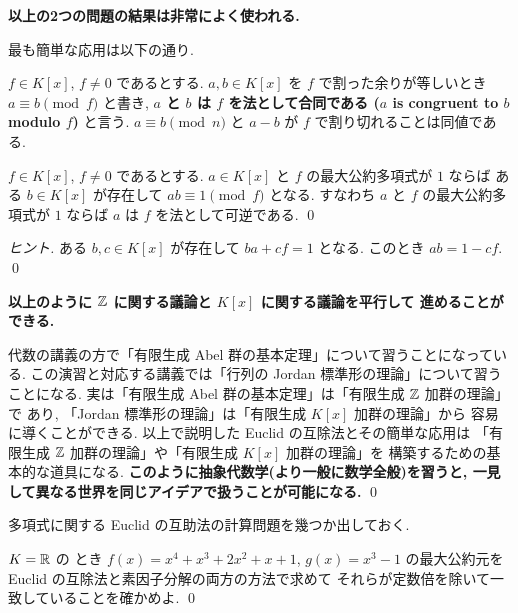 \documentclass[12pt,twoside]{jarticle}
\begin{document}

\bigskip
{\Large\bf 以上の2つの問題の結果は非常によく使われる.}
\bigskip


最も簡単な応用は以下の通り.

$f\in K[x]$, $f\ne 0$ であるとする.
$a,b\in K[x]$ を $f$ で割った余りが等しいとき $a\equiv b\pmod{f}$ と書き, 
{\bf $a$ と $b$ は $f$ を法として合同である 
($a$ is congruent to $b$ modulo $f$)} と言う.
$a\equiv b\pmod{n}$ と $a-b$ が $f$ で割り切れることは同値である.

\begin{question}[5点]
 $f\in K[x]$, $f\ne 0$ であるとする.
 $a\in K[x]$ と $f$ の最大公約多項式が $1$ ならば
 ある $b\in K[x]$ が存在して $ab\equiv 1\pmod{f}$ となる.
 すなわち $a$ と $f$ の最大公約多項式が $1$ ならば %
 $a$ は $f$ を法として可逆である.
 \qed
\end{question}

\begin{proof}[ヒント]
 ある $b,c\in K[x]$ が存在して $ba+cf=1$ となる.
 このとき $ab = 1 - cf$. \qed
\end{proof}


\bigskip
{\Large\bf 以上のように ${\mathbb Z}$ に関する議論と $K[x]$ に関する議論を平行して
進めることができる.}

\begin{guide}
 代数の講義の方で「有限生成 Abel 群の基本定理」について習うことになっている. 
 この演習と対応する講義では「行列の Jordan 標準形の理論」について習うことになる.
 実は「有限生成 Abel 群の基本定理」は「有限生成 ${\mathbb Z}$ 加群の理論」で
 あり, 「Jordan 標準形の理論」は「有限生成 $K[x]$ 加群の理論」から
 容易に導くことができる.
 以上で説明した Euclid の互除法とその簡単な応用は
 「有限生成 ${\mathbb Z}$ 加群の理論」や「有限生成 $K[x]$ 加群の理論」を
 構築するための基本的な道具になる.
 {\bf このように抽象代数学(より一般に数学全般)を習うと, 
 一見して異なる世界を同じアイデアで扱うことが可能になる.}
 \qed
\end{guide}

多項式に関する Euclid の互助法の計算問題を幾つか出しておく.


\begin{question}[3点]
\label{q:Euclidean-algorithm-example}
  $K={\mathbb R}$ の
  とき $f(x)=x^4+x^3+2x^2+x+1$,
  $g(x)=x^3-1$ の最大公約元を 
  Euclid の互除法と素因子分解の両方の方法で求めて
  それらが定数倍を除いて一致していることを確かめよ.
  \qed
\end{question}
\end{document}
